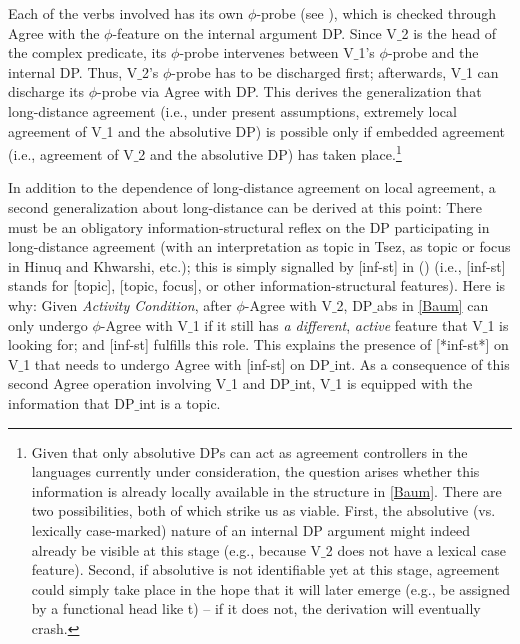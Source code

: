 \documentclass[output=paper
,modfonts
,nonflat]{langsci/langscibook}
\begin{document}
Each of the verbs involved has its own $\phi$-probe
(see \cite{Bejar&Rezac:09}), which is checked through Agree with the
$\phi$-feature on the internal argument DP. Since V$\_$2 is the head of
the complex predicate, its $\phi$-probe intervenes between V$\_$1's
$\phi$-probe and the internal DP.  Thus, V$\_$2's $\phi$-probe has to be
discharged first; afterwards, V$\_$1 can discharge its  $\phi$-probe via
Agree with DP. This
derives the generalization that long-distance agreement (i.e., under
present assumptions, extremely local agreement of V$\_$1 and the absolutive DP)
is possible only if embedded agreement (i.e., agreement of V$\_$2 and the
absolutive DP) has taken place.\footnote{Given that only absolutive
  DPs can act as agreement controllers in the languages currently
  under consideration, the question arises whether this information is
  already locally available in the structure in \ref{Baum}. There are
  two possibilities, both of which strike us as viable. First, the
  absolutive (vs. lexically case-marked) nature of an internal DP
  argument might indeed already be visible at this stage (e.g.,
  because V$\_$2 does not have a lexical case feature). Second, if
  absolutive is not identifiable yet at this stage, agreement could
  simply take place in the hope that it will later emerge (e.g., be
  assigned by a functional head like t) -- if it does not, the
  derivation will eventually crash.}

In addition to the dependence of long-distance agreement on local
agreement, a second generalization about long-distance can be derived
at this point: There must be an obligatory information-structural
reflex on the DP participating in long-distance agreement (with an
interpretation as topic in Tsez, as topic or focus in Hinuq and
Khwarshi, etc.); this is simply signalled by [inf-st] in (\Last) (i.e.,
[inf-st] stands for [topic], [topic, focus], or other
information-structural features). Here is why: 
Given   {\itshape Activity Condition}, after $\phi$-Agree
  with V$\_$2, DP$\_${abs} in \ref{Baum} can only undergo $\phi$-Agree
  with V$\_$1 if it still has {\itshape a different}, {\itshape active} feature
  that V$\_$1 is looking for; and [inf-st] fulfills this role.
 This explains the presence of [*inf-st*] on V$\_$1 that needs to undergo
 Agree with [inf-st] on  DP$\_${int}. As a consequence of this second
 Agree operation involving V$\_$1 and DP$\_${int}, V$\_$1 is equipped with the
 information that DP$\_${int} is a topic. 
\end{document}
